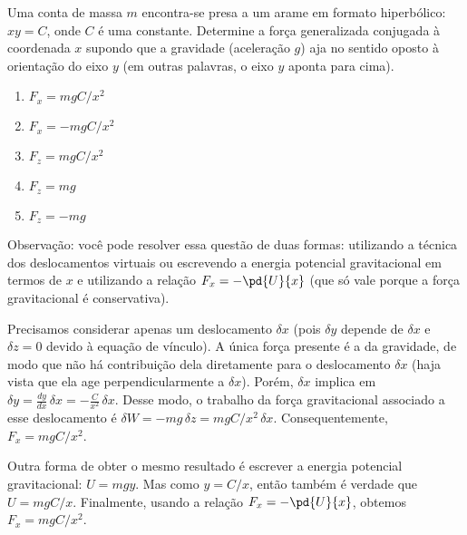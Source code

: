 \begin{question}
    Uma conta de massa $m$ encontra-se presa a um arame em formato hiperbólico: $xy = C$, onde $C$ é uma constante.
    Determine a força generalizada conjugada à coordenada $x$ supondo que a gravidade (aceleração $g$) aja no sentido oposto à orientação do eixo $y$ (em outras palavras, o eixo $y$ aponta para cima).
    \begin{enumerate}
      \item $F_x = mgC/x^2$ \rightanswer
      \item $F_x = -mgC/x^2$
      \item $F_z = mgC/x^2$
      \item $F_z = mg$
      \item $F_z = -mg$
    \end{enumerate}

     \bigskip
    \begin{compactdesc}
      \item[Observação:] você pode resolver essa questão de duas formas: utilizando a técnica dos deslocamentos virtuais ou escrevendo a energia potencial gravitacional em termos de $x$ e utilizando a relação $F_x = -\pd{U}{x}$ (que só vale porque a força gravitacional é conservativa).
    \end{compactdesc}

    \begin{solution}
      Precisamos considerar apenas um deslocamento $\delta x$ (pois $\delta y$ depende de $\delta x$ e $\delta z = 0$ devido à equação de vínculo).
      A única força presente é a da gravidade, de modo que não há contribuição dela diretamente para o deslocamento $\delta x$ (haja vista que ela age perpendicularmente a $\delta x$).
      Porém, $\delta x$ implica em $\delta y = \frac{dy}{dx}\,\delta x = -\frac{C}{x^2}\,\delta x$.
      Desse modo, o trabalho da força gravitacional associado a esse deslocamento é $\delta W = -mg\,\delta z = mgC/x^2\,\delta x$.
      Consequentemente, $F_x = mgC/x^2$.

      Outra forma de obter o mesmo resultado é escrever a energia potencial gravitacional: $U = mgy$.
      Mas como $y = C/x$, então também é verdade que $U = mgC/x$.
      Finalmente, usando a relação $F_x = -\pd{U}{x}$, obtemos $F_x = mgC/x^2$.
    \end{solution}
\end{question}